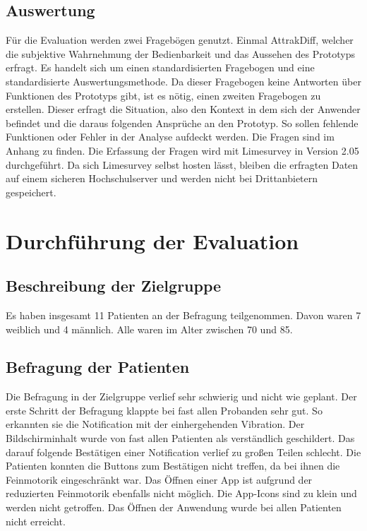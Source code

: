 \subsection{Auswertung}
Für die Evaluation werden zwei Fragebögen genutzt. Einmal AttrakDiff\cite{UserInDe:Attrakdiff}, welcher die subjektive  Wahrnehmung der Bedienbarkeit und das Aussehen des Prototyps erfragt. Es handelt sich um einen standardisierten Fragebogen und eine standardisierte Auswertungsmethode. Da dieser Fragebogen keine Antworten über Funktionen des Prototyps gibt, ist es nötig, einen zweiten Fragebogen zu erstellen. Dieser erfragt die Situation, also den Kontext in dem sich der Anwender befindet und die daraus folgenden Ansprüche an den Prototyp. So sollen fehlende Funktionen oder Fehler in der Analyse aufdeckt werden. Die Fragen sind im Anhang zu finden.
Die Erfassung der Fragen wird mit Limesurvey\cite{Limesurvey} in Version 2.05 durchgeführt. Da sich Limesurvey selbst hosten lässt, bleiben die erfragten Daten auf einem sicheren Hochschulserver und werden nicht bei Drittanbietern gespeichert. 

\section{Durchführung der Evaluation}
\subsection{Beschreibung der Zielgruppe}
Es haben insgesamt 11 Patienten  an der Befragung teilgenommen. Davon waren 7 weiblich und 4 männlich. Alle waren im Alter zwischen 70 und 85. 

\subsection{Befragung der Patienten}
Die Befragung in der Zielgruppe verlief sehr schwierig und nicht wie geplant.
Der erste Schritt der Befragung klappte bei fast allen Probanden sehr gut. So erkannten sie die Notification mit der einhergehenden Vibration. Der Bildschirminhalt wurde von fast allen Patienten als verständlich geschildert. Das darauf folgende Bestätigen einer Notification verlief zu großen Teilen schlecht. Die Patienten konnten die Buttons zum Bestätigen nicht treffen, da bei ihnen die Feinmotorik eingeschränkt war.
Das Öffnen einer App ist aufgrund der reduzierten Feinmotorik ebenfalls nicht möglich. Die App-Icons sind zu klein und werden nicht getroffen. Das Öffnen der Anwendung wurde bei allen Patienten nicht erreicht.
